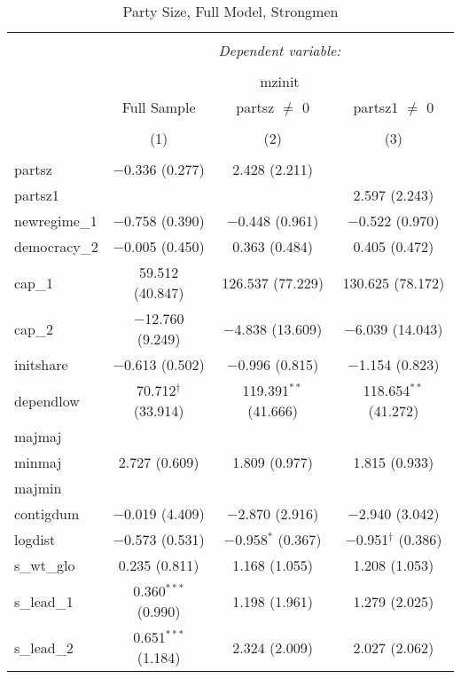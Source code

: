
\begin{table}[!htbp] \centering 
  \caption{Party Size, Full Model, Strongmen} 
  \label{} 
\begin{tabular}{@{\extracolsep{5pt}}lccc} 
\\[-1.8ex]\hline 
\hline \\[-1.8ex] 
 & \multicolumn{3}{c}{\textit{Dependent variable:}} \\ 
\cline{2-4} 
\\[-1.8ex] & \multicolumn{3}{c}{mzinit} \\ 
 & Full Sample & partsz $\neq$ 0 & partsz1 $\neq$ 0 \\ 
\\[-1.8ex] & (1) & (2) & (3)\\ 
\hline \\[-1.8ex] 
 partsz & $-$0.336 (0.277) & 2.428 (2.211) &  \\ 
  partsz1 &  &  & 2.597 (2.243) \\ 
  newregime\_1 & $-$0.758 (0.390) & $-$0.448 (0.961) & $-$0.522 (0.970) \\ 
  democracy\_2 & $-$0.005 (0.450) & 0.363 (0.484) & 0.405 (0.472) \\ 
  cap\_1 & 59.512 (40.847) & 126.537 (77.229) & 130.625 (78.172) \\ 
  cap\_2 & $-$12.760 (9.249) & $-$4.838 (13.609) & $-$6.039 (14.043) \\ 
  initshare & $-$0.613 (0.502) & $-$0.996 (0.815) & $-$1.154 (0.823) \\ 
  dependlow & 70.712$^{\dagger}$ (33.914) & 119.391$^{**}$ (41.666) & 118.654$^{**}$ (41.272) \\ 
  majmaj &  &  &  \\ 
  minmaj & 2.727 (0.609) & 1.809 (0.977) & 1.815 (0.933) \\ 
  majmin &  &  &  \\ 
  contigdum & $-$0.019 (4.409) & $-$2.870 (2.916) & $-$2.940 (3.042) \\ 
  logdist & $-$0.573 (0.531) & $-$0.958$^{*}$ (0.367) & $-$0.951$^{\dagger}$ (0.386) \\ 
  s\_wt\_glo & 0.235 (0.811) & 1.168 (1.055) & 1.208 (1.053) \\ 
  s\_lead\_1 & 0.360$^{***}$ (0.990) & 1.198 (1.961) & 1.279 (2.025) \\ 
  s\_lead\_2 & 0.651$^{***}$ (1.184) & 2.324 (2.009) & 2.027 (2.062) \\ 

\end{tabular}
\end{table}
